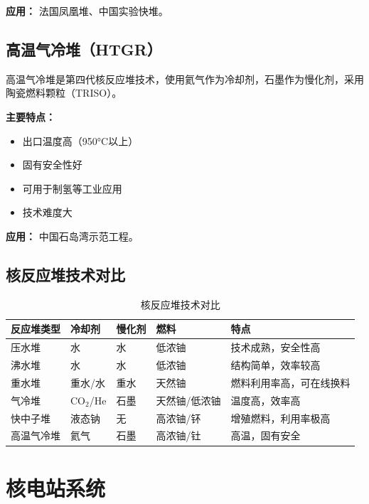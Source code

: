 \documentclass[12pt,UTF8]{ctexbook}
\begin{document}
\textbf{应用：} 法国凤凰堆、中国实验快堆。

\section{高温气冷堆（HTGR）}

高温气冷堆是第四代核反应堆技术，使用氦气作为冷却剂，石墨作为慢化剂，采用陶瓷燃料颗粒（TRISO）。

\textbf{主要特点：}
\begin{itemize}[leftmargin=2cm]
    \item 出口温度高（950°C以上）
    \item 固有安全性好
    \item 可用于制氢等工业应用
    \item 技术难度大
\end{itemize}

\textbf{应用：} 中国石岛湾示范工程。

\section{核反应堆技术对比}

\begin{table}[htbp]
    \centering
    \caption{核反应堆技术对比}
    \label{tab:reactor_comparison}
    \begin{tabular}{|l|l|l|l|l|}
    \hline
    \textbf{反应堆类型} & \textbf{冷却剂} & \textbf{慢化剂} & \textbf{燃料} & \textbf{特点} \\ \hline
    压水堆 & 水 & 水 & 低浓铀 & 技术成熟，安全性高 \\ \hline
    沸水堆 & 水 & 水 & 低浓铀 & 结构简单，效率较高 \\ \hline
    重水堆 & 重水/水 & 重水 & 天然铀 & 燃料利用率高，可在线换料 \\ \hline
    气冷堆 & CO$_2$/He & 石墨 & 天然铀/低浓铀 & 温度高，效率高 \\ \hline
    快中子堆 & 液态钠 & 无 & 高浓铀/钚 & 增殖燃料，利用率极高 \\ \hline
    高温气冷堆 & 氦气 & 石墨 & 高浓铀/钍 & 高温，固有安全 \\ \hline
    \end{tabular}
\end{table}

\chapter{核电站系统}
\end{document}
